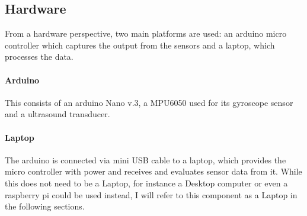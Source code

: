 \subsection{Hardware}
\label{subsec:hardware}

From a hardware perspective, two main platforms are used: an arduino micro controller which captures the output from the sensors and a laptop, which processes the data.

\paragraph{Arduino}
This consists of an arduino Nano v.3, a MPU6050 used for its gyroscope sensor and a ultrasound transducer.

\paragraph{Laptop}
The arduino is connected via mini USB cable to a laptop, which provides the micro controller with power and receives and evaluates sensor data from it.
While this does not need to be a Laptop, for instance a Desktop computer or even a raspberry pi could be used instead, I will refer to this component as a Laptop in the following sections.
